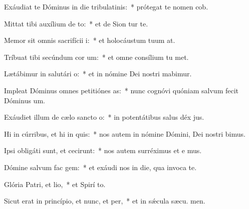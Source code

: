 \item Exáudiat te Dóminus in die tribulatinis:~* prótegat te nomen  cob.
\item Mittat tibi auxílium de to:~* et de Sion tur te.
\item Memor sit omnis sacrifícii i:~* et holocáustum tuum  at.
\item Tríbuat tibi secúndum cor um:~* et omne consílium tu met.
\item Lætábimur in salutári o:~* et in nómine Dei nostri mabimur.
\item Impleat Dóminus omnes petitiónes as:~* nunc cognóvi quóniam salvum fecit Dóminus  um.
\item Exáudiet illum de cælo sancto o:~* in potentátibus salus déx jus.
\item Hi in cúrribus, et hi in quis:~* nos autem in nómine Dómini, Dei nostri bimus.
\item Ipsi obligáti sunt, et cecirunt:~* nos autem surréximus et e mus.
\item Dómine salvum fac gem:~* et exáudi nos in die, qua invoca te.
\item Glória Patri, et lio,~* et Spirí to.
\item Sicut erat in princípio, et nunc, et per,~* et in sǽcula sæcu. men.
